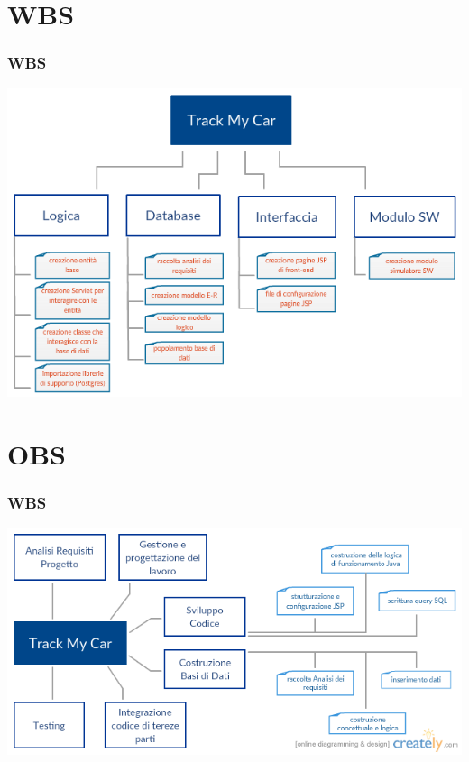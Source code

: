 \documentclass[a4paper,12pt]{beamer}
\begin{document}
\section{WBS}
\begin{frame}
\frametitle{WBS}
\includegraphics[scale=.5]{wbs.png}
\end{frame}

\pagebreak

\section{OBS}
\begin{frame}
\frametitle{WBS}
\includegraphics[scale=.5]{obs.png}
\end{frame}


\pagebreak
\end{document}
